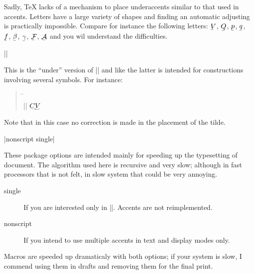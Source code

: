 \documentclass{ltxguide}
\newenvironment{sample}{\begin{quote}\small\begin{tabbing}%
  \hskip14pc\=\hskip6pc\\}
  {\end{tabbing}\end{quote}}
\begin{document}
Sadly, \TeX{} lacks of a mechanism to place underaccents similar to 
that used in accents.  Letters have a large variety of shapes and 
finding an automatic adjusting is practically impossible.  Compare for 
instance the following letters:
\begingroup
\def\\{\underaccent{\bar}}%
$\\V$, $\\Q$, $\\p$, $\\q$, $\\f$,
$\\\beta$, $\\\gamma$, $\\{\mathcal{F}}$, $\\{\mathcal{A}}$
\endgroup
and you wil understand the difficulties.

\begin{decl}
||
\end{decl}

This is the ``under'' version of |\widetilde| and like the latter is intended for constructions
involving several symbols. For instance:
\begin{sample}
|| \> $\undertilde{CV}$
\end{sample}
Note that in this case no correction is made in the placement of the tilde.

\begin{decl}
|nonscript single|
\end{decl}

These package options are intended mainly for speeding up the 
typesetting of document.  The algorithm used here is recursive and 
very slow; although in fast processors that is not felt, in slow 
system that could be very annoying.

\begin{description}
\item[single] If you are interested only in |\accentset|.
 Accents are not reimplemented.
\item[nonscript] If you intend to use multiple accents in
 text and display modes only.
\end{description}

Macros are speeded up dramaticaly with both options; if your system is slow,
I commend using them in drafts and removing them for the final print.
\end{document}
